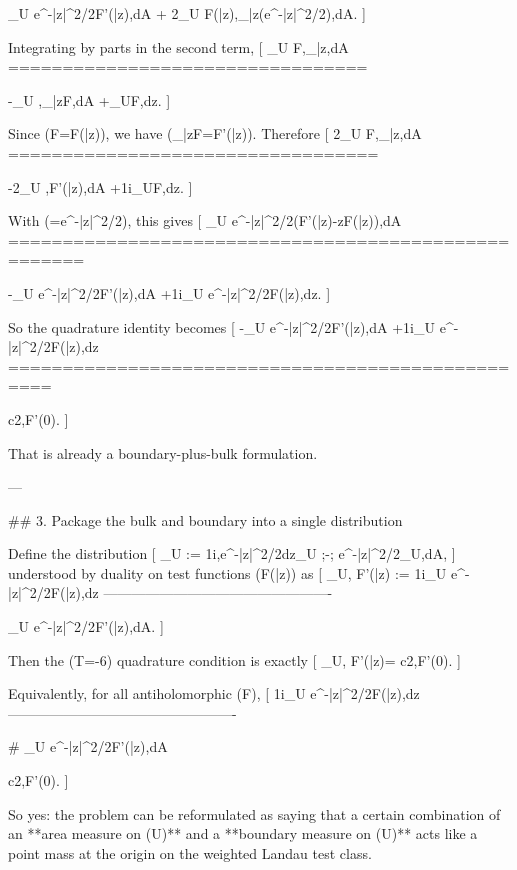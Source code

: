 \int_U e^{-|z|^2/2}F'(\bar z),dA
+
2\int_U F(\bar z),\partial_{\bar z}\big(e^{-|z|^2/2}\big),dA.
]

Integrating by parts in the second term,
[
\int_U F,\partial_{\bar z}\phi,dA
=================================

-\int_U \phi,\partial_{\bar z}F,dA
+\int_{\partial U}\phi F,dz.
]

Since (F=F(\bar z)), we have (\partial_{\bar z}F=F'(\bar z)). Therefore
[
2\int_U F,\partial_{\bar z}\phi,dA
==================================

-2\int_U \phi,F'(\bar z),dA
+\frac1i\int_{\partial U}\phi F,dz.
]

With (\phi=e^{-|z|^2/2}), this gives
[
\int_U e^{-|z|^2/2}\big(F'(\bar z)-zF(\bar z)\big),dA
=====================================================

-\int_U e^{-|z|^2/2}F'(\bar z),dA
+\frac1i\int_{\partial U} e^{-|z|^2/2}F(\bar z),dz.
]

So the quadrature identity becomes
[
-\int_U e^{-|z|^2/2}F'(\bar z),dA
+\frac1i\int_{\partial U} e^{-|z|^2/2}F(\bar z),dz
==================================================

\frac c2,F'(0).
]

That is already a boundary-plus-bulk formulation.

---

## 3. Package the bulk and boundary into a single distribution

Define the distribution
[
\mu_U := \frac1i,e^{-|z|^2/2}dz\lfloor_{\partial U}
;-;
e^{-|z|^2/2}_U,dA,
]
understood by duality on test functions (F(\bar z)) as
[
\langle \mu_U, F'(\bar z)\rangle
:=
\frac1i\int_{\partial U} e^{-|z|^2/2}F(\bar z),dz
-------------------------------------------------

\int_U e^{-|z|^2/2}F'(\bar z),dA.
]

Then the (T=-6) quadrature condition is exactly
[
\langle \mu_U, F'(\bar z)\rangle = \frac c2,F'(0).
]

Equivalently, for all antiholomorphic (F),
[
\frac1i\int_{\partial U} e^{-|z|^2/2}F(\bar z),dz
-------------------------------------------------

# \int_U e^{-|z|^2/2}F'(\bar z),dA

\frac c2,F'(0).
]

So yes: the problem can be reformulated as saying that a certain combination of an **area measure on (U)** and a **boundary measure on (\partial U)** acts like a point mass at the origin on the weighted Landau test class.

